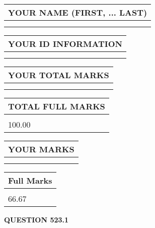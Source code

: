 \documentclass{ctexart}
\begin{document}
   
   
   
\newpage 
\setcounter{page}{ 
   523001 } 
   
   
   
   
\noindent\begin{tabular}{|l|}
\hline
YOUR NAME (FIRST, ... LAST)  \\
\hline
 \\ 
 \\ 
\hline
\end{tabular}
\hspace{0.05in} \begin{tabular}{|l|}
\hline
 YOUR   ID   INFORMATION  \\
\hline
 \\ 
 \\ 
\hline
\end{tabular}
   
   
\vspace{0.2in}\noindent\begin{tabular}{|l|}
\hline
YOUR TOTAL MARKS  \\
\hline
 \\ 
 \\ 
\hline
\end{tabular}
\hspace{0.05in} \begin{tabular}{|l|}
\hline
TOTAL FULL MARKS  \\
\hline
 \\ 
100.00 \\
\hline
\end{tabular}
   
   
 \vspace{0.2in}
 
 
 
 
   
   
  
\vspace{0.2in}
  
\noindent\begin{tabular}{|l|}
\hline
 YOUR MARKS  \\
\hline
 \\ 
 \\ 
\hline
\end{tabular}
\hspace{0.05in} \begin{tabular}{|l|}
\hline
 Full Marks  \\
\hline
 \\ 
66.67 \\
\hline
\end{tabular}
{\textbf{\Large{QUESTION
523.1 
}}}
  
\end{document}
